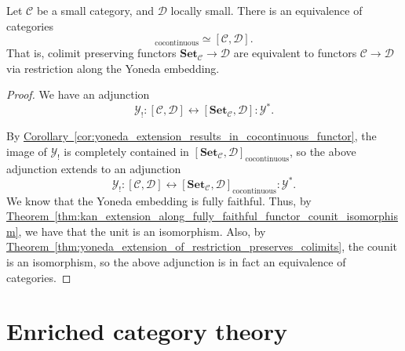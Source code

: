\documentclass[main.tex]{subfiles}
\begin{document}
\begin{corollary}
  \label{cor:functors_equivalent_to_cocontinuous_functors_out_of_presheafs}
  Let $\mathcal{C}$ be a small category, and $\mathcal{D}$ locally small. There is an equivalence of categories
  \begin{equation*}
    [\mathbf{Set}_{\mathcal{C}} , \mathcal{D}]_{\mathrm{cocontinuous}} \simeq [\mathcal{C}, \mathcal{D}].
  \end{equation*}
  That is, colimit preserving functors $\mathbf{Set}_{\mathcal{C}}  \to \mathcal{D}$ are equivalent to functors $\mathcal{C} \to \mathcal{D}$ via restriction along the Yoneda embedding.
\end{corollary}
\begin{proof}
  We have an adjunction
  \begin{equation*}
    \mathcal{Y}_{!}: [\mathcal{C}, \mathcal{D}] \leftrightarrow [\mathbf{Set}_{\mathcal{C}} , \mathcal{D}] : \mathcal{Y}^{*}.
  \end{equation*}

  By \hyperref[cor:yoneda_extension_results_in_cocontinuous_functor]{Corollary~\ref*{cor:yoneda_extension_results_in_cocontinuous_functor}}, the image of $\mathcal{Y}_{!}$ is completely contained in $[\mathbf{Set}_{\mathcal{C}} , \mathcal{D}]_{\mathrm{cocontinuous}}$, so the above adjunction extends to an adjunction
  \begin{equation*}
    \mathcal{Y}_{!}: [\mathcal{C}, \mathcal{D}] \leftrightarrow [\mathbf{Set}_{\mathcal{C}} , \mathcal{D}]_{\mathrm{cocontinuous}} : \mathcal{Y}^{*}.
  \end{equation*}
  We know that the Yoneda embedding is fully faithful. Thus, by \hyperref[thm:kan_extension_along_fully_faithful_functor_counit_isomorphism]{Theorem~\ref*{thm:kan_extension_along_fully_faithful_functor_counit_isomorphism}}, we have that the unit is an isomorphism. Also, by \hyperref[thm:yoneda_extension_of_restriction_preserves_colimits]{Theorem~\ref*{thm:yoneda_extension_of_restriction_preserves_colimits}}, the counit is an isomorphism, so the above adjunction is in fact an equivalence of categories.
\end{proof}

\section{Enriched category theory}
\label{sec:enriched_category_theory}
\end{document}
